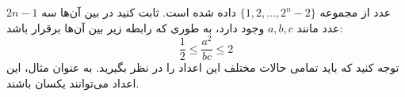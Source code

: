 \p
$2n-1$
عدد از مجموعه 
$\{1, 2, ..., 2^n-2\}$
داده شده است. ثابت کنید در بین آن‌ها سه عدد مانند
$a, b, c $
وجود دارد، به طوری که رابطه زیر بین آن‌ها برقرار باشد:
$$\frac{1}{2} \leq \frac{a^2}{bc} \leq 2$$
توجه کنید که باید تمامی حالات مختلف این اعداد را در نظر بگیرید. به عنوان مثال، این اعداد می‌توانند یکسان باشند.